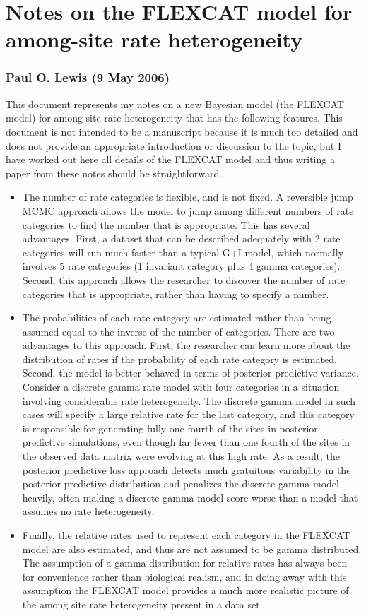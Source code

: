 \documentclass[12pt]{article}
\begin{document}
\section{Notes on the FLEXCAT model for among-site rate heterogeneity}
\subsubsection{Paul O. Lewis (9 May 2006)}

This document represents my notes on a new Bayesian model (the FLEXCAT model) for among-site rate heterogeneity that has the following features. This document is not intended to be a manuscript because it is much too detailed and does not provide an appropriate introduction or discussion to the topic, but I have worked out here all details of the FLEXCAT model and thus writing a paper from these notes should be straightforward.

\begin{itemize}
\item The number of rate categories is flexible, and is not fixed. A reversible jump MCMC approach allows the model to jump among different numbers of rate categories to find the number that is appropriate. This has several advantages. First, a dataset that can be described adequately with 2 rate categories will run much faster than a typical G+I model, which normally involves 5 rate categories (1 invariant category plus 4 gamma categories). Second, this approach allows the researcher to discover the number of rate categories that is appropriate, rather than having to specify a number.
\item The probabilities of each rate category are estimated rather than being assumed equal to the inverse of the number of categories. There are two advantages to this approach. First, the researcher can learn more about the distribution of rates if the probability of each rate category is estimated. Second, the model is better behaved in terms of posterior predictive variance. Consider a discrete gamma rate model with four categories in a situation involving considerable rate heterogeneity. The discrete gamma model in such cases will specify a large relative rate for the last category, and this category is responsible for generating fully one fourth of the sites in posterior predictive simulations, even though far fewer than one fourth of the sites in the observed data matrix were evolving at this high rate. As a result, the posterior predictive loss approach detects much gratuitous variability in the posterior predictive distribution and penalizes the discrete gamma model heavily, often making a discrete gamma model score worse than a model that assumes no rate heterogeneity.
\item Finally, the relative rates used to represent each category in the FLEXCAT model are also estimated, and thus are not assumed to be gamma distributed. The assumption of a gamma distribution for relative rates has always been for convenience rather than biological realism, and in doing away with this assumption the FLEXCAT model provides a much more realistic picture of the among site rate heterogeneity present in a data set.
\end{itemize}
\end{document}
